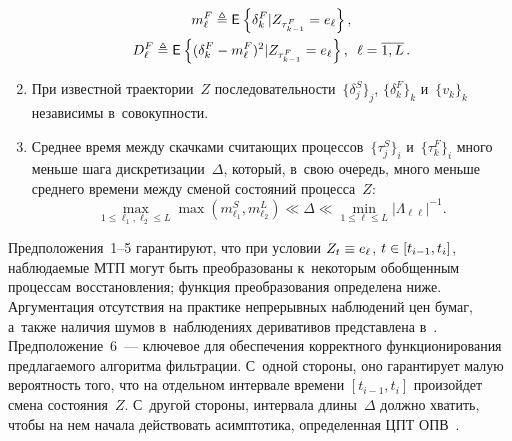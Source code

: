\begin{multicols}{2}
\begin{enumerate}
\begin{multline*}
m_{\ell}^F \triangleq \mathsf{E}_{  }\left\{ \mathop{\delta_k^F | Z_{\tau_{k-1}^F} = e_{\ell}} \right\}, \\
D_{\ell}^F  \triangleq  \mathsf{E}_{  }\left\{ \mathop{(\delta_k^F - m_{\ell}^F )^2 | Z_{\tau_{k-1}^F} = 
e_{\ell}} \right\} , \enskip \ell = \overline{1, L}\,.
\end{multline*}
\item
При известной траектории~$Z$ последовательности~$\{\delta_j^S\}_j$, 
$\{\delta_k^F\}_k$ и~$\{v_k\}_k$ независимы в~совокупности.
\item
Среднее время между скачками считающих процессов~$\{\tau_j^S\}_i$ 
и~$\{\tau_k^F\}_i$ много меньше шага дискретизации~$\Delta$, который, в~свою 
очередь, много меньше среднего времени между сменой со\-сто\-яний процесса~$Z$:
$$
\max\limits_{1 \leqslant \ell_1,\ell_2 \leqslant L} \max\left(m_{\ell_1}^S, m_{\ell_2}^L\right) 
\ll \Delta \ll \min\limits_{1 \leqslant \ell \leqslant L} |\Lambda_{\ell \ell}|^{-1}.
$$
\end{enumerate}

Предположения~1--5 гарантируют, что при условии $Z_t \hm\equiv e_{\ell}$,  $t \hm\in 
[t_{i-1},t_i]$, наблюдаемые МТП могут быть преобразованы к~некоторым обобщенным 
процессам восстановления; функция преобразования определена  ниже. Аргументация 
отсутствия на практике непрерывных наблюдений цен бумаг, а~так\-же наличия шумов 
в~наблюдениях деривативов представлена в~\cite{B_23_3_IA}.
Предположение~6~--- ключевое для обеспечения корректного функционирования 
предлагаемого алгоритма фильт\-ра\-ции. С~одной стороны, оно гарантирует малую 
вероятность того, что на отдельном интервале времени  $[t_{i-1},t_i]$ произойдет 
смена состояния~$Z$. С~другой стороны, интервала длины~$\Delta$ должно хватить, 
чтобы на нем начала действовать асимптотика, определенная ЦПТ ОПВ~\cite{Smith_55}.


\end{multicols}
